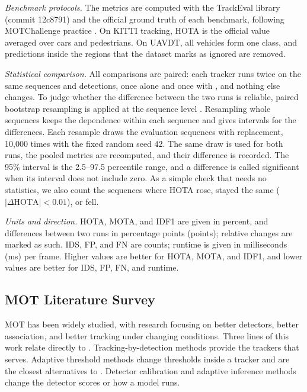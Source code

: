 \emph{Benchmark protocols.} The metrics are computed with the TrackEval library (commit 12c8791)
and the official ground truth of each benchmark, following MOTChallenge practice
\cite{dendorfer2021motchallenge}. On KITTI tracking, HOTA is the official value averaged over cars
and pedestrians. On UAVDT, all vehicles form one class, and predictions inside the regions that the
dataset marks as ignored are removed.

\emph{Statistical comparison.} All comparisons are paired: each tracker runs twice on the same
sequences and detections, once alone and once with \scl{}, and nothing else changes. To judge
whether the difference between the two runs is reliable, paired bootstrap resampling is applied at
the sequence level \cite{efron1993bootstrap}. Resampling whole sequences keeps the dependence within
each sequence and gives intervals for the differences. Each resample draws the evaluation sequences
with replacement, 10,000 times with the fixed random seed 42. The same draw is used for both runs,
the pooled metrics are recomputed, and their difference is recorded. The 95\% interval is the
2.5--97.5 percentile range, and a difference is called significant when its interval does not
include zero. As a simple check that needs no statistics, we also count the sequences where HOTA
rose, stayed the same ($|\Delta\mathrm{HOTA}|<0.01$), or fell.

\emph{Units and direction.} HOTA, MOTA, and IDF1 are given in percent, and differences between two
runs in percentage points (points); relative changes are marked as such. IDS, FP, and FN are counts;
runtime is given in milliseconds (ms) per frame. Higher values are better for HOTA, MOTA, and IDF1,
and lower values are better for IDS, FP, FN, and runtime.

\subsection{MOT Literature Survey}\label{sec:survey}
MOT has been widely studied, with research focusing on better detectors, better association, and
better tracking under changing conditions. Three lines of this work relate directly to \scl{}.
Tracking-by-detection methods provide the trackers that \scl{} serves. Adaptive threshold methods
change thresholds inside a tracker and are the closest alternatives to \scl{}. Detector calibration
and adaptive inference methods change the detector scores or how a model runs.

